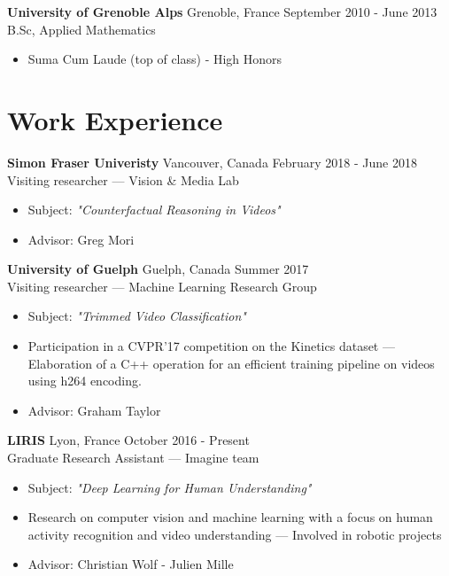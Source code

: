 \documentclass[10pt]{res} %
\begin{document}
\begin{resume}
\textbf{University of Grenoble Alps} \hfill Grenoble, France \hfill September 2010 - June 2013 \\
B.Sc, Applied Mathematics
\begin{itemize}
\item Suma Cum Laude (top of class) - High Honors
\end{itemize}
 

\section{\large Work Experience} 

\textbf{Simon Fraser Univeristy} \hfill Vancouver, Canada \hfill February 2018 - June 2018 \\
Visiting researcher --- Vision \& Media Lab
\begin{itemize}
\item Subject: \textit{"Counterfactual Reasoning in Videos" }
\item Advisor: Greg Mori
\end{itemize}

\textbf{University of Guelph} \hfill Guelph, Canada \hfill Summer 2017 \\
Visiting researcher --- Machine Learning Research Group
\begin{itemize}
\item Subject: \textit{"Trimmed Video Classification"}
\item Participation in a CVPR'17 competition on the Kinetics dataset --- Elaboration of a C++ operation for an efficient training  pipeline on videos using h264 encoding.
\item Advisor: Graham Taylor
\end{itemize}

 \newpage
 
\textbf{LIRIS} \hfill Lyon, France \hfill October 2016 - Present \\
Graduate Research Assistant --- Imagine team
\begin{itemize} 
\item Subject: \textit{"Deep Learning for Human Understanding"}
\item Research on computer vision and machine learning with a focus on human activity recognition and video understanding ---  Involved in robotic projects
\item Advisor: Christian Wolf - Julien Mille
\end{itemize}


\end{resume}
\end{document}
